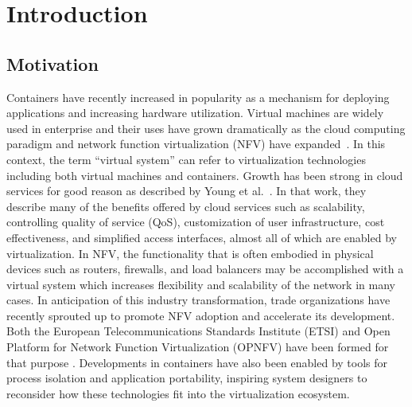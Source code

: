 \chapter{Introduction}
\label{sec:introduction}

\section{Motivation} %
\label{sec:motivation}
Containers have recently increased in popularity as a mechanism for deploying applications and increasing hardware utilization.
Virtual machines are widely used in enterprise and their uses have grown dramatically as the cloud computing paradigm and network function virtualization (NFV) have expanded~\autocite{cohnopnfv, opnfv1}.
In this context, the term ``virtual system'' can refer to virtualization technologies including both virtual machines and containers.
Growth has been strong in cloud services for good reason as described by Young et al.~\autocite{_younge_1}.
In that work, they describe many of the benefits offered by cloud services such as scalability, controlling quality of service (QoS), customization of user infrastructure, cost effectiveness, and simplified access interfaces, almost all of which are enabled by virtualization.  
In NFV, the functionality that is often embodied in physical devices such as routers, firewalls, and load balancers may be accomplished with a virtual system which increases flexibility and scalability of the network in many cases.
In anticipation of this industry transformation, trade organizations have recently sprouted up to promote NFV adoption and accelerate its development.
Both the European Telecommunications Standards Institute (ETSI) and Open Platform for Network Function Virtualization (OPNFV) have been formed for that purpose \autocite{opnfv1, cohnopnfv}.
Developments in containers have also been enabled by tools for process isolation and application portability, inspiring system designers to reconsider how these technologies fit into the virtualization ecosystem.

